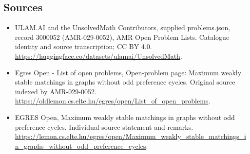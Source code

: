 \documentclass[11pt,a4paper]{article}
\begin{document}
\subsection{Sources}
\begin{itemize}
\item[S1] ULAM.AI and the UnsolvedMath Contributors, supplied problems.json, record 3000052 (AMR-029-0052), AMR Open Problem Lists. Catalogue identity and source transcription; CC BY 4.0.
\url{https://huggingface.co/datasets/ulamai/UnsolvedMath}.
\item[S2] Egres Open - List of open problems, Open-problem page: Maximum weakly stable matchings in graphs without odd preference cycles. Original source indexed by AMR-029-0052.
\url{https://oldlemon.cs.elte.hu/egres/open/List_of_open_problems}.
\item[S3] EGRES Open, Maximum weakly stable matchings in graphs without odd preference cycles. Individual source statement and remarks.
\url{https://lemon.cs.elte.hu/egres/open/Maximum_weakly_stable_matchings_in_graphs_without_odd_preference_cycles}.
\end{itemize}
\end{document}
